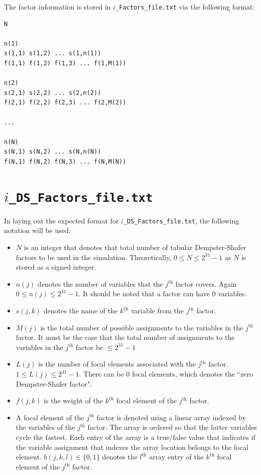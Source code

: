 \documentclass{article}
\begin{document}
The factor information is stored in \texttt{$i$\_Factors\_file.txt} via the following format:
\begin{verbatim}
N

n(1)
s(1,1) s(1,2) ... s(1,n(1))
f(1,1) f(1,2) f(1,3) ... f(1,M(1))

n(2)
s(2,1) s(2,2) ... s(2,n(2))
f(2,1) f(2,2) f(2,3) ... f(2,M(2))

...

n(N)
s(N,1) s(N,2) ... s(N,n(N))
f(N,1) f(N,2) f(N,3) ... f(N,M(N))
\end{verbatim} 



\section{\texttt{$i$\_DS\_Factors\_file.txt}}

In laying out the expected format for \texttt{$i$\_DS\_Factors\_file.txt}, the following notation will be used:
\begin{itemize}
\item $N$ is an integer that denotes that total number of tabular Dempster-Shafer factors to be used in the simulation. Theoretically, $0 \leq N \leq 2^{31} - 1$ as $N$ is stored as a signed integer. 
\item $n(j)$ denotes the number of variables that the $j^\text{th}$ factor covers. Again $0 \leq n(j) \leq 2^{31} - 1$. It should be noted that a factor can have 0 variables. 
\item $s(j,k)$ denotes the name of the $k^\text{th}$ variable from the $j^\text{th}$ factor. 
\item $M(j)$ is the total number of possible assignments to the variables in the $j^\text{th}$ factor. It must be the case that the total number of assignments to the variables in the $j^\text{th}$ factor be $\leq 2^{31} - 1$
\item $L(j)$ is the number of focal elements associated with the $j^\text{th}$ factor. $1 \leq L(j) \leq 2^{31} - 1$. There can be 0 focal elements, which denotes the ``zero Dempster-Shafer factor".
\item $f(j,k)$ is the weight of the $k^\text{th}$ focal element of the $j^\text{th}$ factor.
\item A focal element of the $j^\text{th}$ factor is denoted using a linear array indexed by the variables of the $j^\text{th}$ factor. The array is ordered so that the latter variables cycle the fastest. Each entry of the array is a true/false value that indicates if the variable assignment that indexes the array location belongs to the focal element. $b(j,k,l) \in \{0,1\}$ denotes the $l^\text{th}$ array entry of the $k^\text{th}$ focal element of the $j^\text{th}$ factor. 
\end{itemize}
\end{document}

